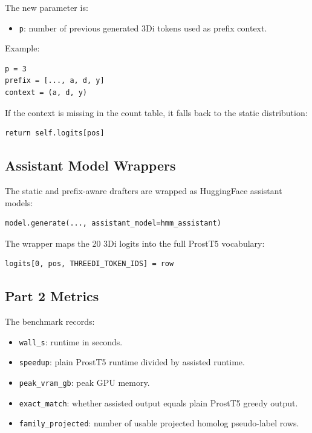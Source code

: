 \documentclass[11pt,a4paper]{article}
\begin{document}
The new parameter is:

\begin{itemize}
  \item \texttt{p}: number of previous generated 3Di tokens used as prefix context.
\end{itemize}

Example:

\begin{verbatim}
p = 3
prefix = [..., a, d, y]
context = (a, d, y)
\end{verbatim}

If the context is missing in the count table, it falls back to the static distribution:

\begin{verbatim}
return self.logits[pos]
\end{verbatim}

\subsection{Assistant Model Wrappers}

The static and prefix-aware drafters are wrapped as HuggingFace assistant models:

\begin{verbatim}
model.generate(..., assistant_model=hmm_assistant)
\end{verbatim}

The wrapper maps the 20 3Di logits into the full ProstT5 vocabulary:

\begin{verbatim}
logits[0, pos, THREEDI_TOKEN_IDS] = row
\end{verbatim}

\subsection{Part 2 Metrics}

The benchmark records:

\begin{itemize}
  \item \texttt{wall\_s}: runtime in seconds.
  \item \texttt{speedup}: plain ProstT5 runtime divided by assisted runtime.
  \item \texttt{peak\_vram\_gb}: peak GPU memory.
  \item \texttt{exact\_match}: whether assisted output equals plain ProstT5 greedy output.
  \item \texttt{family\_projected}: number of usable projected homolog pseudo-label rows.
\end{itemize}
\end{document}
